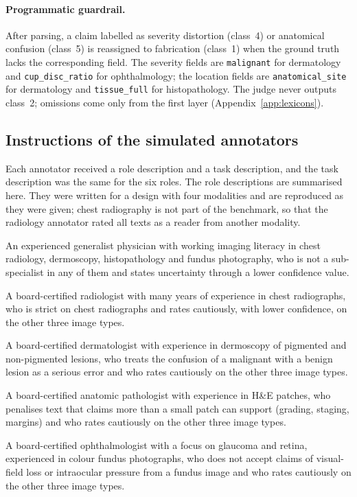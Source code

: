 \documentclass[11pt,a4paper]{article}
\begin{document}
\begin{appendices}
\paragraph{Programmatic guardrail.}
After parsing, a claim labelled as severity distortion (class~4) or anatomical confusion (class~5) is reassigned to fabrication (class~1) when the ground truth lacks the corresponding field. The severity fields are \texttt{malignant} for dermatology and \texttt{cup\_disc\_ratio} for ophthalmology; the location fields are \texttt{anatomical\_site} for dermatology and \texttt{tissue\_full} for histopathology. The judge never outputs class~2; omissions come only from the first layer (Appendix~\ref{app:lexicons}).


\subsection{Instructions of the simulated annotators}\label{app:annotator_prompts}
Each annotator received a role description and a task description, and the task description was the same for the six roles. The role descriptions are summarised here. They were written for a design with four modalities and are reproduced as they were given; chest radiography is not part of the benchmark, so that the radiology annotator rated all texts as a reader from another modality.
\begin{description}\small
  \item[Generalist] An experienced generalist physician with working imaging literacy in chest radiology, dermoscopy, histopathology and fundus photography, who is not a sub-specialist in any of them and states uncertainty through a lower confidence value.
  \item[Radiology] A board-certified radiologist with many years of experience in chest radiographs, who is strict on chest radiographs and rates cautiously, with lower confidence, on the other three image types.
  \item[Dermatology] A board-certified dermatologist with experience in dermoscopy of pigmented and non-pigmented lesions, who treats the confusion of a malignant with a benign lesion as a serious error and who rates cautiously on the other three image types.
  \item[Histopathology] A board-certified anatomic pathologist with experience in H\&E patches, who penalises text that claims more than a small patch can support (grading, staging, margins) and who rates cautiously on the other three image types.
  \item[Ophthalmology] A board-certified ophthalmologist with a focus on glaucoma and retina, experienced in colour fundus photographs, who does not accept claims of visual-field loss or intraocular pressure from a fundus image and who rates cautiously on the other three image types.

\end{description}
\end{appendices}
\end{document}
